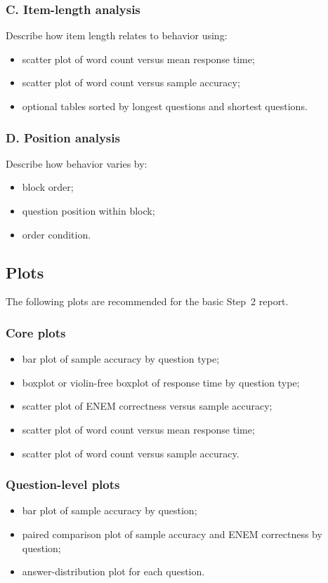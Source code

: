 \subsubsection*{C. Item-length analysis}
Describe how item length relates to behavior using:
\begin{itemize}
    \item scatter plot of word count versus mean response time;
    \item scatter plot of word count versus sample accuracy;
    \item optional tables sorted by longest questions and shortest questions.
\end{itemize}

\subsubsection*{D. Position analysis}
Describe how behavior varies by:
\begin{itemize}
    \item block order;
    \item question position within block;
    \item order condition.
\end{itemize}

\subsection{Plots}
The following plots are recommended for the basic Step~2 report.

\subsubsection*{Core plots}
\begin{itemize}
    \item bar plot of sample accuracy by question type;
    \item boxplot or violin-free boxplot of response time by question type;
    \item scatter plot of ENEM correctness versus sample accuracy;
    \item scatter plot of word count versus mean response time;
    \item scatter plot of word count versus sample accuracy.
\end{itemize}

\subsubsection*{Question-level plots}
\begin{itemize}
    \item bar plot of sample accuracy by question;
    \item paired comparison plot of sample accuracy and ENEM correctness by question;
    \item answer-distribution plot for each question.
\end{itemize}


